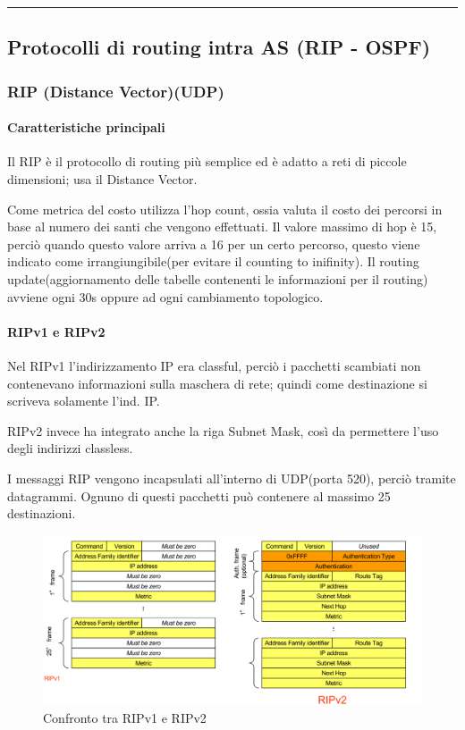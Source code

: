 \vspace{0.5em}
\noindent\rule{\linewidth}{0.4pt}
\vspace{0.5em}

\subsection{Protocolli di routing intra AS (RIP - OSPF)}
\subsubsection{RIP (Distance Vector)(UDP)}
\paragraph{Caratteristiche principali}
Il RIP è il protocollo di routing più semplice ed è adatto a reti di piccole dimensioni; usa il Distance Vector.

Come metrica del costo utilizza l'hop count, ossia valuta il costo dei percorsi in base al numero dei santi che vengono effettuati.
Il valore massimo di hop è 15, perciò quando questo valore arriva a 16 per un certo percorso, questo viene indicato come irrangiungibile(per evitare il counting to inifinity).
Il routing update(aggiornamento delle tabelle contenenti le informazioni per il routing) avviene ogni 30s oppure ad ogni cambiamento topologico.

\newpage


\paragraph{RIPv1 e RIPv2}

 Nel RIPv1 l'indirizzamento IP era classful, perciò i pacchetti scambiati non contenevano informazioni sulla maschera di rete; quindi come destinazione si scriveva solamente l'ind. IP.

 RIPv2 invece ha integrato anche la riga Subnet Mask, così da permettere l'uso degli indirizzi classless. 

 I messaggi RIP vengono incapsulati all'interno di UDP(porta 520), perciò tramite datagrammi. Ognuno di questi pacchetti può contenere al massimo 25 destinazioni.

\begin{figure}[h!]
    \centering
    \includegraphics[width=1\textwidth]{images/RIPversioni.png}
    \caption{Confronto tra RIPv1 e RIPv2}
    \label{fig:ripversioni}
\end{figure}

